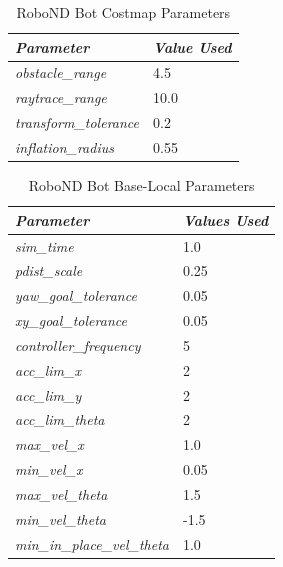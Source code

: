 \documentclass[10pt,journal,compsoc]{IEEEtran}
\begin{document}
\begin{table}[h]
\renewcommand{\arraystretch}{1.5}
\centering
\begin{tabular}{|l|l|}
\hline
\textit{\textbf{Parameter}}   & \textit{\textbf{Value Used}} \\ \hline
\textit{obstacle\_range}      & 4.5                         \\ \hline
\textit{raytrace\_range}      & 10.0                         \\ \hline
\textit{transform\_tolerance} & 0.2                          \\ \hline
\textit{inflation\_radius}    & 0.55                          \\ \hline
\end{tabular}
\vspace{5pt}
\caption{RoboND Bot Costmap Parameters}
\label{table:cost-params-robond-bot}
\end{table}

\begin{table}[h]
\renewcommand{\arraystretch}{1.5}
\centering
\begin{tabular}{|l|l|}
\hline
\textit{\textbf{Parameter}}         & \textit{\textbf{Values Used}} \\ \hline
\textit{sim\_time}                  & 1.0                           \\ \hline
\textit{pdist\_scale}               & 0.25                           \\ \hline
\textit{yaw\_goal\_tolerance}       & 0.05                         \\ \hline
\textit{xy\_goal\_tolerance}        & 0.05                          \\ \hline
\textit{controller\_frequency}      & 5                             \\ \hline
\textit{acc\_lim\_x}                & 2                             \\ \hline
\textit{acc\_lim\_y}                & 2                             \\ \hline
\textit{acc\_lim\_theta}            & 2                             \\ \hline
\textit{max\_vel\_x}                & 1.0                           \\ \hline
\textit{min\_vel\_x}                & 0.05                          \\ \hline
\textit{max\_vel\_theta}            & 1.5                           \\ \hline
\textit{min\_vel\_theta}            & -1.5                          \\ \hline
\textit{min\_in\_place\_vel\_theta} & 1.0                           \\ \hline
\end{tabular}
\vspace{5pt}
\caption{RoboND Bot Base-Local Parameters}
\label{table:base-local-params-robond-bot}
\end{table}
 
\end{document}
